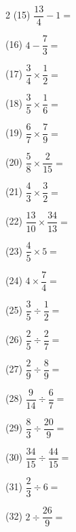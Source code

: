 \documentclass[a4paper, 11pt]{ltjsarticle}
\begin{document}
\begin{multicols*}{2}
\noindent (15) \quad $\dfrac{13}{4}-1 =$
\vspace*{\fill}

\noindent (16) \quad $4-\dfrac{7}{3} =$
\vspace*{\fill}
\columnbreak

\noindent (17) \quad $\dfrac{3}{4}\times\dfrac{1}{2} =$
\vspace*{\fill}

\noindent (18) \quad $\dfrac{3}{5}\times\dfrac{1}{6} =$
\vspace*{\fill}

\noindent (19) \quad $\dfrac{6}{7}\times\dfrac{7}{9} =$
\vspace*{\fill}

\noindent (20) \quad $\dfrac{5}{8}\times\dfrac{2}{15} =$
\vspace*{\fill}

\noindent (21) \quad $\dfrac{4}{3}\times\dfrac{3}{2} =$
\vspace*{\fill}

\noindent (22) \quad $\dfrac{13}{10}\times\dfrac{34}{13} =$
\vspace*{\fill}

\noindent (23) \quad $\dfrac{4}{5}\times5 =$
\vspace*{\fill}

\noindent (24) \quad $4\times\dfrac{7}{4} =$
\vspace*{\fill}
\columnbreak

\noindent (25) \quad $\dfrac{3}{5}\div\dfrac{1}{2} =$
\vspace*{\fill}

\noindent (26) \quad $\dfrac{2}{5}\div\dfrac{2}{7} =$
\vspace*{\fill}

\noindent (27) \quad $\dfrac{2}{9}\div\dfrac{8}{9} =$
\vspace*{\fill}

\noindent (28) \quad $\dfrac{9}{14}\div\dfrac{6}{7} =$
\vspace*{\fill}

\noindent (29) \quad $\dfrac{8}{3}\div\dfrac{20}{9} =$
\vspace*{\fill}

\noindent (30) \quad $\dfrac{34}{15}\div\dfrac{44}{15} =$
\vspace*{\fill}

\noindent (31) \quad $\dfrac{2}{3}\div6 =$
\vspace*{\fill}

\noindent (32) \quad $2\div\dfrac{26}{9} =$
\vspace*{\fill}

\end{multicols*}
\end{document}
